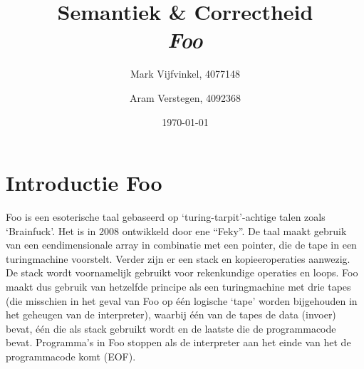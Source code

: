 \documentclass[11pt]{article}
\title{\textbf{Semantiek \& Correctheid \\ \emph{Foo}}}
\author{
	Mark Vijfvinkel, 4077148
	\and Aram Verstegen, 4092368
}
\date{\today}
\begin{document}
\maketitle


\section{Introductie Foo}

Foo is een esoterische taal gebaseerd op `turing-tarpit'-achtige talen zoals `Brainfuck'. Het is in 2008 ontwikkeld door ene ``Feky''.
De taal maakt gebruik van een eendimensionale array in combinatie met een pointer, die de tape in een turingmachine voorstelt.
Verder zijn er een stack en kopieeroperaties aanwezig.
De stack wordt voornamelijk gebruikt voor rekenkundige operaties en loops.
Foo maakt dus gebruik van hetzelfde principe als een turingmachine met drie tapes (die misschien in het geval van Foo op \'e\'en logische `tape' worden bijgehouden in het geheugen van de interpreter), waarbij \'e\'en van de tapes de data (invoer) bevat, \'e\'en die als stack gebruikt wordt en de laatste die de programmacode bevat. %
Programma's in Foo stoppen als de interpreter aan het einde van het de programmacode komt (EOF).
\end{document}
